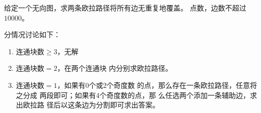 \begin{prob}
	给定一个无向图，求两条欧拉路径将所有边无重复地覆盖。
	点数，边数不超过$10000$。
\end{prob}

\begin{sol}
	分情况讨论如下：
	\begin{enumerate}
		\item 连通块数$\ge 3$，无解
		\item 连通块数$=2$，在两个连通块
			内分别求欧拉路径。
		\item 连通块数$=1$，如果有0个或2个奇度数
			的点，那么存在一条欧拉路径，任意将之分成
			两段即可；如果有4个奇度数的点，那
			么任选两个添加一条辅助边，求出欧拉路
			径后以这条边为分割即可求出答案。
	\end{enumerate}
\end{sol}
